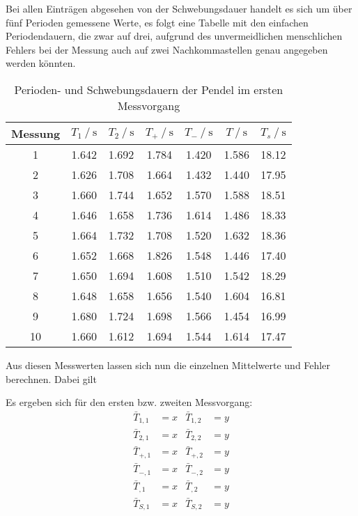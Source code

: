 Bei allen Einträgen abgesehen von der Schwebungsdauer handelt es sich um über fünf Perioden gemessene Werte, es folgt eine Tabelle mit den einfachen Periodendauern, die zwar auf drei,
aufgrund des unvermeidlichen menschlichen Fehlers bei der Messung auch auf zwei Nachkommastellen genau angegeben werden könnten. 
\newpage

\begin{table}
  \centering
  \caption{Perioden- und Schwebungsdauern der Pendel im ersten Messvorgang}
  \label{tab:Messvorgang 2}
  \begin{tabular}{S[table-format=2.0] S S S S S S[table-format=2.2]}
      \toprule
      {Messung} & {$T_1 \mathbin{/} \unit{\second}$} & {$T_2 \mathbin{/} \unit{\second}$} 
      & {$T_+ \mathbin{/} \unit{\second}$} & {$T_- \mathbin{/} \unit{\second}$} & {$T \mathbin{/} \unit{\second}$} & {$T_s \mathbin{/} \unit{\second}$} \\
       & 1.642 & 1.692 & 1.784 & 1.420 & 1.586 & 18.12 \\  
       2 & 1.626 & 1.708 & 1.664 & 1.432 & 1.440 & 17.95 \\ 
       3 & 1.660 & 1.744 & 1.652 & 1.570 & 1.588 & 18.51 \\ 
       4 & 1.646 & 1.658 & 1.736 & 1.614 & 1.486 & 18.33 \\ 
       5 & 1.664 & 1.732 & 1.708 & 1.520 & 1.632 & 18.36 \\ 
       6 & 1.652 & 1.668 & 1.826 & 1.548 & 1.446 & 17.40 \\ 
       7 & 1.650 & 1.694 & 1.608 & 1.510 & 1.542 & 18.29 \\ 
       8 & 1.648 & 1.658 & 1.656 & 1.540 & 1.604 & 16.81 \\ 
       9 & 1.680 & 1.724 & 1.698 & 1.566 & 1.454 & 16.99 \\ 
      10 & 1.660 & 1.612 & 1.694 & 1.544 & 1.614 & 17.47 \\ 
      \bottomrule
  \end{tabular}
\end{table}

Aus diesen Messwerten lassen sich nun die einzelnen Mittelwerte und Fehler berechnen. Dabei gilt


\newpage

Es ergeben sich für den ersten bzw. zweiten Messvorgang:
\begin{align}
  \bar{T}_{1,1} & = x  & \bar{T}_{1,2} & = y \\
  \bar{T}_{2,1} & = x  & \bar{T}_{2,2} & = y \\ 
  \bar{T}_{+,1} & = x  & \bar{T}_{+,2} & = y \\
  \bar{T}_{-,1} & = x  & \bar{T}_{-,2} & = y \\
  \bar{T}_{,1}  & = x  & \bar{T}_{,2}  & = y \\
  \bar{T}_{S,1} & = x  & \bar{T}_{S,2} & = y 
\end{align}

